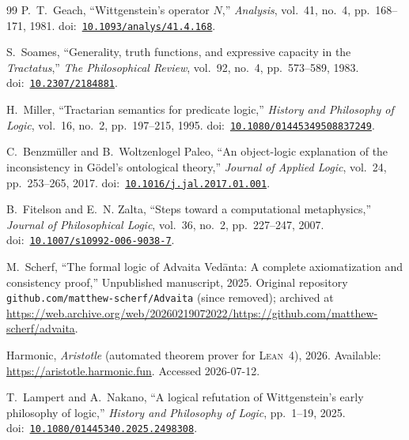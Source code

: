 \documentclass[jsl,bibother]{asl}
\theoremstyle{definition}
\theoremstyle{remark}
\newcommand{\Lean}{\textsc{Lean}}
\begin{document}
\begin{thebibliography}{99}
P.~T.~Geach,
``Wittgenstein's operator $N$,''
\emph{Analysis}, vol.~41, no.~4, pp.~168--171, 1981.
\newline doi:~\href{https://doi.org/10.1093/analys/41.4.168}{\texttt{10.1093/analys/41.4.168}}.

S.~Soames,
``Generality, truth functions, and expressive capacity in the
\emph{Tractatus},''
\emph{The Philosophical Review}, vol.~92, no.~4, pp.~573--589, 1983.
\newline doi:~\href{https://doi.org/10.2307/2184881}{\texttt{10.2307/2184881}}.

H.~Miller,
``Tractarian semantics for predicate logic,''
\emph{History and Philosophy of Logic}, vol.~16, no.~2,
pp.~197--215, 1995.
\newline doi:~\href{https://doi.org/10.1080/01445349508837249}{\texttt{10.1080/01445349508837249}}.

C.~Benzm\"uller and B.~Woltzenlogel Paleo,
``An object-logic explanation of the inconsistency in G\"odel's
ontological theory,''
\emph{Journal of Applied Logic}, vol.~24, pp.~253--265, 2017.
\newline doi:~\href{https://doi.org/10.1016/j.jal.2017.01.001}{\texttt{10.1016/j.jal.2017.01.001}}.

B.~Fitelson and E.~N. Zalta,
``Steps toward a computational metaphysics,''
\emph{Journal of Philosophical Logic}, vol.~36, no.~2,
pp.~227--247, 2007.
\newline doi:~\href{https://doi.org/10.1007/s10992-006-9038-7}{\texttt{10.1007/s10992-006-9038-7}}.

M.~Scherf,
``The formal logic of Advaita Ved\=anta: A complete
axiomatization and consistency proof,''
Unpublished manuscript, 2025.
Original repository \texttt{github.com/matthew-scherf/Advaita}
(since removed); archived at
\url{https://web.archive.org/web/20260219072022/https://github.com/matthew-scherf/advaita}.

Harmonic,
\emph{Aristotle} (automated theorem prover for \Lean~4), 2026.
Available: \url{https://aristotle.harmonic.fun}.
Accessed 2026-07-12.

T.~Lampert and A.~Nakano,
``A logical refutation of Wittgenstein's early philosophy of
logic,''
\emph{History and Philosophy of Logic}, pp.~1--19, 2025.
\newline doi:~\href{https://doi.org/10.1080/01445340.2025.2498308}{\texttt{10.1080/01445340.2025.2498308}}.


\end{thebibliography}
\end{document}
